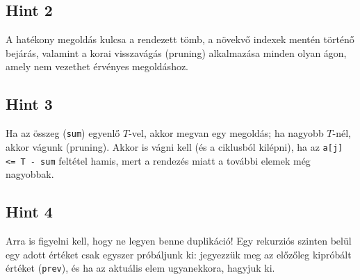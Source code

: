 \documentclass[12pt,a4paper]{article}
\begin{document}
\subsection*{Hint 2}
A hatékony megoldás kulcsa a rendezett tömb, a növekvő indexek mentén történő bejárás, valamint a korai visszavágás (pruning) alkalmazása minden olyan ágon, amely nem vezethet érvényes megoldáshoz.

\subsection*{Hint 3}
Ha az összeg (\texttt{sum}) egyenlő $T$-vel, akkor megvan egy megoldás; ha nagyobb $T$-nél, akkor vágunk (pruning). Akkor is vágni kell (és a ciklusból kilépni), ha az \texttt{a[j] <= T - sum} feltétel hamis, mert a rendezés miatt a további elemek még nagyobbak.

\subsection*{Hint 4}
Arra is figyelni kell, hogy ne legyen benne duplikáció! Egy rekurziós szinten belül egy adott értéket csak egyszer próbáljunk ki: jegyezzük meg az előzőleg kipróbált értéket (\texttt{prev}), és ha az aktuális elem ugyanekkora, hagyjuk ki.
\end{document}

